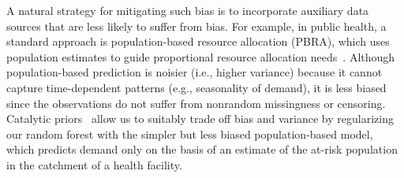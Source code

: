 \documentclass[12pt]{article}
\begin{document}
A natural strategy for mitigating such bias is to incorporate auxiliary data sources that are less likely to suffer from bias. For example, in public health, a standard approach is population-based resource allocation (PBRA), which uses population estimates to guide proportional resource allocation needs~\cite{Stevens2016GATHER}. Although population-based prediction is noisier (i.e., higher variance) because it cannot capture time-dependent patterns (e.g., seasonality of demand), it is less biased since the observations do not suffer from nonrandom missingness or censoring. Catalytic priors~\cite{huang2020catalytic} allow us to suitably trade off bias and variance by regularizing our random forest with the simpler but less biased population-based model, which predicts demand only on the basis of an estimate of the at-risk population in the catchment of a health facility.
\end{document}
